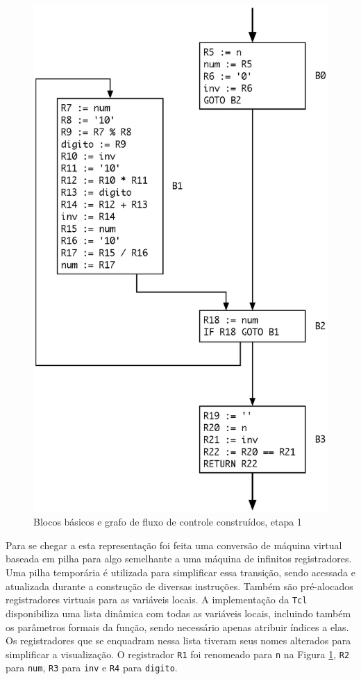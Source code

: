 \begin{figure}[ht!]
  \centering
  \includegraphics[scale=0.68]{figs/palindromo_bbs1}
  \caption{Blocos básicos e grafo de fluxo de controle construídos,
    etapa 1 \label{bbs}}
\end{figure}

Para se chegar a esta representação foi feita uma conversão de
máquina virtual baseada em pilha para algo semelhante a
uma máquina de infinitos registradores. Uma pilha temporária é
utilizada para simplificar essa transição, sendo acessada e atualizada
durante a construção de diversas instruções. Também são pré-alocados
registradores virtuais para as variáveis locais. A implementação da
\texttt{Tcl} disponibiliza uma lista dinâmica com todas as
variáveis locais, incluindo também os parâmetros formais da função,
sendo necessário apenas atribuir índices a elas. Os registradores que se
enquadram nessa lista tiveram seus nomes alterados para simplificar a
visualização. O registrador \verb!R1! foi renomeado para \verb!n! na
Figura \ref{bbs}, \verb!R2! para \verb!num!, \verb!R3! para \verb!inv!
e \verb!R4! para \verb!digito!.

